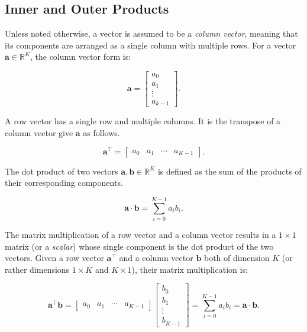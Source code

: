 \documentclass[twoside]{article}
\begin{document}
\begin{appendices}

\section{Inner and Outer Products}
\label{section:inner_and_outer_products}

Unless noted otherwise, a vector is assumed to be a \textit{column vector}, meaning that its components are arranged as a single column with multiple rows. For a vector $\boldsymbol{a} \in \mathbb{R}^K$, the column vector form is:

\[
    \boldsymbol{a} = 
    \begin{bmatrix}
        a_0 \\
        a_1 \\
        \vdots \\
        a_{k-1}
    \end{bmatrix}.
\]

A row vector has a single row and multiple columns. It is the transpose of a column vector give $\boldsymbol{a}$ as follows.

\[
    \boldsymbol{a}^\top =
    \begin{bmatrix}
        a_0 & a_1 & \cdots & a_{K-1}
    \end{bmatrix}.
\]

The dot product of two vectors $\boldsymbol{a}, \boldsymbol{b} \in \mathbb{R}^K$ is defined as the sum of the products of their corresponding components.

\[
    \boldsymbol{a} \cdot \boldsymbol{b} = \sum_{i=0}^{K-1} a_i b_i.
\]

The matrix multiplication of a row vector and a column vector results in a $1 \times 1$ matrix (or a \textit{scalar}) whose single component is the dot product of the two vectors. Given a row vector $\boldsymbol{a}^\top$ and a column vector $\boldsymbol{b}$ both of dimension $K$ (or rather dimensions $1 \times K$ and $K \times 1$), their matrix multiplication is:

\[
    \boldsymbol{a}^\top \boldsymbol{b} = 
    \begin{bmatrix}
        a_0 & a_1 & \cdots & a_{K-1}
    \end{bmatrix}
    \begin{bmatrix}
        b_0 \\
        b_1 \\
        \vdots \\
        b_{K-1}
    \end{bmatrix} = 
    \sum_{i=0}^{K-1} a_i b_i = \boldsymbol{a} \cdot \boldsymbol{b}.
\]


\end{appendices}
\end{document}

